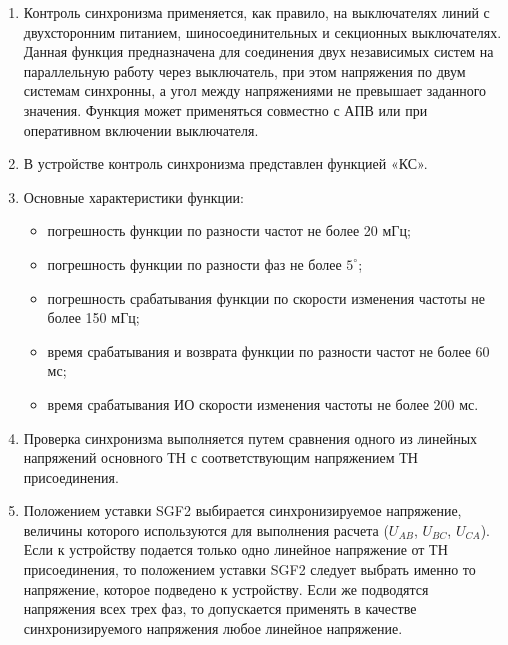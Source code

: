
\color{black}

\begin{enumerate}

\item
Контроль синхронизма применяется, как правило, на выключателях линий с двухсторонним питанием, шиносоединительных и секционных выключателях. Данная функция предназначена для соединения двух независимых систем на параллельную работу через выключатель, при этом напряжения по двум системам синхронны, а угол между напряжениями не превышает заданного значения. Функция может применяться совместно с АПВ или при оперативном включении выключателя.

\item
В устройстве контроль синхронизма представлен функцией «КС».

\item
Основные характеристики функции:
\begin{itemize}
    \item погрешность функции по разности частот не более 20 мГц;
    \item погрешность функции по разности фаз не более $5^\circ$;
    \item погрешность срабатывания функции по скорости изменения частоты не более 150 мГц; 
    \item время срабатывания и возврата функции по разности частот не более 60 мс;
    \item время срабатывания ИО скорости изменения частоты не более 200 мс.
\end{itemize}

\item
Проверка синхронизма выполняется путем сравнения одного из линейных напряжений основного ТН с соответствующим напряжением ТН присоединения.

\item
Положением уставки SGF2 выбирается синхронизируемое напряжение, величины которого используются для выполнения расчета ($U_{AB}$, $U_{BC}$, $U_{CA}$). Если к устройству подается только одно линейное напряжение от ТН присоединения, то положением уставки SGF2 следует выбрать именно то напряжение, которое подведено к устройству. Если же подводятся напряжения всех трех фаз, то допускается применять в качестве синхронизируемого напряжения любое линейное напряжение.


\end{enumerate}
